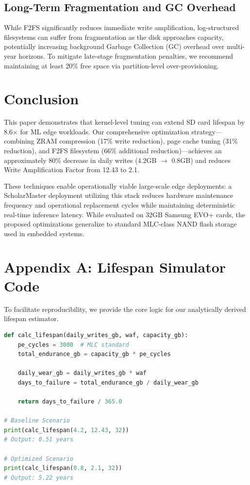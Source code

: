 \documentclass[conference]{IEEEtran}
\begin{document}
\subsection{Long-Term Fragmentation and GC Overhead}
While F2FS significantly reduces immediate write amplification, log-structured filesystems can suffer from fragmentation as the disk approaches capacity, potentially increasing background Garbage Collection (GC) overhead over multi-year horizons. To mitigate late-stage fragmentation penalties, we recommend maintaining at least 20\% free space via partition-level over-provisioning.

\section{Conclusion}

This paper demonstrates that kernel-level tuning can extend SD card lifespan by 8.6$\times$ for ML edge workloads. Our comprehensive optimization strategy---combining ZRAM compression (17\% write reduction), page cache tuning (31\% reduction), and F2FS filesystem (66\% additional reduction)---achieves an approximately 80\% decrease in daily writes (4.2GB $\to$ 0.8GB) and reduces Write Amplification Factor from 12.43 to 2.1.

These techniques enable operationally viable large-scale edge deployments: a ScholarMaster deployment utilizing this stack reduces hardware maintenance frequency and operational replacement cycles while maintaining deterministic real-time inference latency. While evaluated on 32GB Samsung EVO+ cards, the proposed optimizations generalize to standard MLC-class NAND flash storage used in embedded systems.

\section*{Appendix A: Lifespan Simulator Code}
To facilitate reproducibility, we provide the core logic for our analytically derived lifespan estimator.

\begin{lstlisting}[language=Python, caption={Python Lifespan Estimator}]
def calc_lifespan(daily_writes_gb, waf, capacity_gb):
    pe_cycles = 3000  # MLC standard
    total_endurance_gb = capacity_gb * pe_cycles
      
    daily_wear_gb = daily_writes_gb * waf
    days_to_failure = total_endurance_gb / daily_wear_gb
      
    return days_to_failure / 365.0

# Baseline Scenario
print(calc_lifespan(4.2, 12.43, 32)) 
# Output: 0.51 years

# Optimized Scenario
print(calc_lifespan(0.8, 2.1, 32))   
# Output: 5.22 years
\end{lstlisting}
\end{document}
